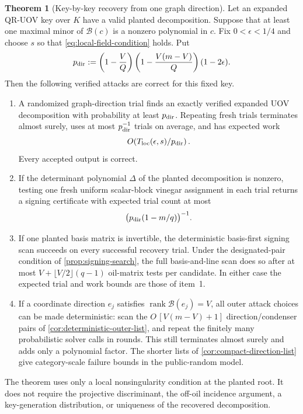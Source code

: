 \documentclass[11pt,a4paper]{article}
\theoremstyle{definition}
\newtheorem{theorem}{Theorem}[section]
\theoremstyle{remark}
\newcommand{\rank}{\operatorname{rank}}
\newcommand{\QRUOV}{\textsf{QR-UOV}}
\begin{document}
\begin{theorem}[Key-by-key recovery from one graph direction]\label{thm:graph-attack}
Let an expanded \QRUOV{} key over $K$ have a valid planted decomposition.  Suppose that at least one maximal minor of $\mathcal B(c)$ is a nonzero polynomial in $c$.  Fix $0<\epsilon<1/4$ and choose $s$ so that \eqref{eq:local-field-condition} holds.  Put
\[
 p_{\rm dir}:=\left(1-\frac VQ\right)
 \left(1-\frac{V(m-V)}Q\right)(1-2\epsilon).
\]
Then the following verified attacks are correct for this fixed key.
\begin{enumerate}
\item A randomized graph-direction trial finds an exactly verified expanded UOV decomposition with probability at least $p_{\rm dir}$.  Repeating fresh trials terminates almost surely, uses at most $p_{\rm dir}^{-1}$ trials on average, and has expected work
\begin{equation}\label{eq:local-expected-decomposition}
 O\!\left(T_{\rm loc}(\epsilon,s)/p_{\rm dir}\right).
\end{equation}
Every accepted output is correct.

\item If the determinant polynomial $\Delta$ of the planted decomposition is nonzero, testing one fresh uniform scalar-block vinegar assignment in each trial returns a signing certificate with expected trial count at most
\begin{equation}\label{eq:local-functional-trials}
 \bigl(p_{\rm dir}(1-m/q)\bigr)^{-1}.
\end{equation}

\item If one planted basis matrix is invertible, the deterministic basis-first signing scan succeeds on every successful recovery trial.  Under the designated-pair condition of \cref{prop:signing-search}, the full basis-and-line scan does so after at most $V+\lfloor V/2\rfloor(q-1)$ oil-matrix tests per candidate.  In either case the expected trial and work bounds are those of item~1.

\item If a coordinate direction $e_j$ satisfies $\rank\mathcal B(e_j)=V$, all outer attack choices can be made deterministic: scan the $O\,[V(m-V)+1]$ direction/condenser pairs of \cref{cor:deterministic-outer-list}, and repeat the finitely many probabilistic solver calls in rounds.  This still terminates almost surely and adds only a polynomial factor.  The shorter lists of \cref{cor:compact-direction-list} give category-scale failure bounds in the public-random model.
\end{enumerate}
The theorem uses only a local nonsingularity condition at the planted root.  It does not require the projective discriminant, the off-oil incidence argument, a key-generation distribution, or uniqueness of the recovered decomposition.
\end{theorem}
\end{document}

